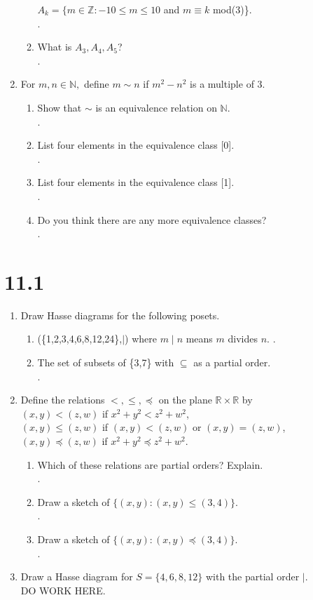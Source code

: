 \documentclass[11pt]{article}
\newcommand{\N}{\mathbb{N}}
\newcommand{\R}{\mathbb{R}}
\newcommand{\Z}{\mathbb{Z}}
\begin{document}
\begin{enumerate}
\begin{enumerate}
		$A_k=\{m\in\Z:-10\leq m\leq 10$ and $m\equiv k$ mod(3)\}.\\
	.
	\item What is $A_3,A_4,A_5$?\\
	.
	\end{enumerate}
\setcounter{enumi}{11}
\item For $m,n\in\N,$ define $m\sim n$ if $m^2-n^2$ is a multiple of 3.
	\begin{enumerate}
	\item Show that $\sim$ is an equivalence relation on $\N$.\\
	.
	\item List four elements in the equivalence class [0].\\
	.
	\item List four elements in the equivalence class [1].\\
	.
	\item Do you think there are any more equivalence classes?\\
	.
	\end{enumerate}
\end{enumerate}

\section*{11.1}
\begin{enumerate}
\item Draw Hasse diagrams for the following posets.
	\begin{enumerate}
	\item (\{1,2,3,4,6,8,12,24\},$\mid$) where $m\mid n$ means $m$ divides $n$.
	.
	\item The set of subsets of \{3,7\} with $\subseteq$ as a partial order.\\
	.
	\end{enumerate}
\setcounter{enumi}{14}
\item Define the relations $<,\leq,\preceq$ on the plane $\R\times\R$ by\\
$(x,y)<(z,w)$ if $x^2+y^2<z^2+w^2$,\\
$(x,y)\leq(z,w)$ if $(x,y)<(z,w)$ or $(x,y)=(z,w)$,\\
$(x,y)\preceq(z,w)$ if $x^2+y^2\preceq z^2+w^2$.
	\begin{enumerate}
	\item Which of these relations are partial orders? Explain.\\
	.
	\setcounter{enumii}{2}
	\item Draw a sketch of $\{(x,y):(x,y)\leq (3,4)\}$.\\
	.
	\item Draw a sketch of $\{(x,y):(x,y)\preceq (3,4)\}$.\\
	.
	\end{enumerate}
\setcounter{enumi}{0}
\item Draw a Hasse diagram for $S=\{4,6,8,12\}$ with the partial order $\mid$.\\
DO WORK HERE.
\end{enumerate}
\end{document}
